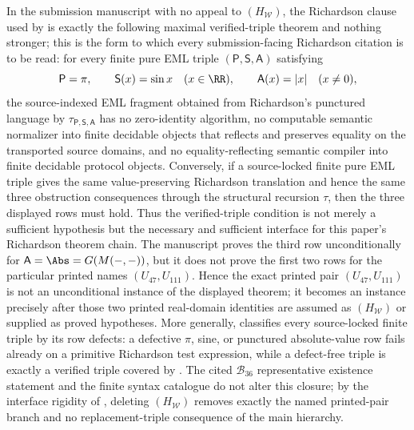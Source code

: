 \begin{theorem}
\label{thm:unconditional-submission-richardson-closure}
\label{thm:verified-triple-only-main-richardson-clause}
In the submission manuscript with no appeal to \((H_{\mathcal W})\), the
Richardson clause used by
is exactly the following maximal verified-triple theorem and nothing stronger;
this is the form to which every submission-facing Richardson citation is to be
read:
for every finite pure EML triple \((\mathsf P,\mathsf S,\mathsf A)\) satisfying
\[
  \mathsf P=\pi,
  \qquad \mathsf S(x)=\sin x\quad(x\in\RR),
  \qquad \mathsf A(x)=|x|\quad(x\ne0),
\]
the source-indexed EML fragment obtained from Richardson's punctured language by
\(\tau_{\mathsf P,\mathsf S,\mathsf A}\) has no zero-identity algorithm, no
computable semantic normalizer into finite decidable objects that reflects and
preserves equality on the transported source domains, and no equality-reflecting
semantic compiler into finite decidable protocol objects.
Conversely, if a source-locked finite pure EML triple gives the same
value-preserving Richardson translation and hence the same three obstruction
consequences through the structural recursion \(\tau\), then the three displayed
rows must hold.  Thus the verified-triple condition is not merely a sufficient
hypothesis but the necessary and sufficient interface for this paper's
Richardson theorem chain.
The manuscript proves the third row unconditionally for
\(\mathsf A=\Abs=G(M(-,-))\), but it does not prove the first two rows for the
particular printed names \((U_{47},U_{111})\).  Hence the exact printed pair
\((U_{47},U_{111})\) is not an unconditional instance of the displayed theorem;
it becomes an instance precisely after those two printed real-domain identities
are assumed as \((H_{\mathcal W})\) or supplied as proved hypotheses.  More generally,
 classifies every source-locked finite
triple by its row defects: a defective \(\pi\), sine, or punctured absolute-value
row fails already on a primitive Richardson test expression, while a defect-free
triple is exactly a verified triple covered by .  The cited
\(\mathcal B_{36}\) representative existence statement and the finite syntax
catalogue do not alter this closure; by the interface rigidity of
, deleting \((H_{\mathcal W})\) removes
exactly the named printed-pair branch and no replacement-triple consequence of
the main hierarchy.
\end{theorem}

